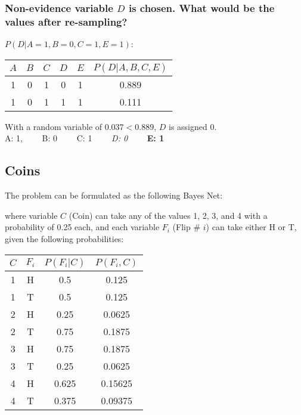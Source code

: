 \documentclass{homework}
\begin{document}
\subsubsection{Non-evidence variable $D$ is chosen. What would be the values after re-sampling?}
$P(D | A=1, B=0, C=1, E=1)$:
\begin{table}[h!]
    \centering
    \begin{tabular}{ccccc|c}
        $A$ & $B$ & $C$ & $D$ & $E$ & $P(D | A, B, C, E)$ \\
        \midrule
        1 & 0 & 1 & 0 & 1 & 0.889 \\
        1 & 0 & 1 & 1 & 1 & 0.111 \\
    \end{tabular}
\end{table}
With a random variable of $0.037 < 0.889$, $D$ is assigned $0$.\\
A: 1, \ \ \ \ B: 0 \ \ \ \ C: 1 \ \ \ \ \textit{D: 0} \ \ \ \ \textbf{E: 1} \\

\clearpage
\exercise[4]
\subsection{Coins}
The problem can be formulated as the following Bayes Net:
\begin{figure}[h!]
    \centering
    
\end{figure}
where variable $C$ (Coin) can take any of the values 1, 2, 3, and 4 with a probability of 0.25 each,
and each variable $F_i$ (Flip \# $i$) can take either H or T, given the following probabilities:

\begin{table}[h!]
    \centering
    \begin{tabular}{cc|c|c}
        $C$ & $F_i$ & $P(F_i | C)$ & $P(F_i, C)$  \\
        \midrule
        1 & H & 0.5 & 0.125 \\
        1 & T & 0.5 & 0.125 \\
        2 & H & 0.25 & 0.0625 \\
        2 & T & 0.75 & 0.1875 \\
        3 & H & 0.75 & 0.1875 \\
        3 & T & 0.25 & 0.0625 \\
        4 & H & 0.625 & 0.15625 \\
        4 & T & 0.375 & 0.09375 \\
    \end{tabular}
\end{table}
\end{document}
